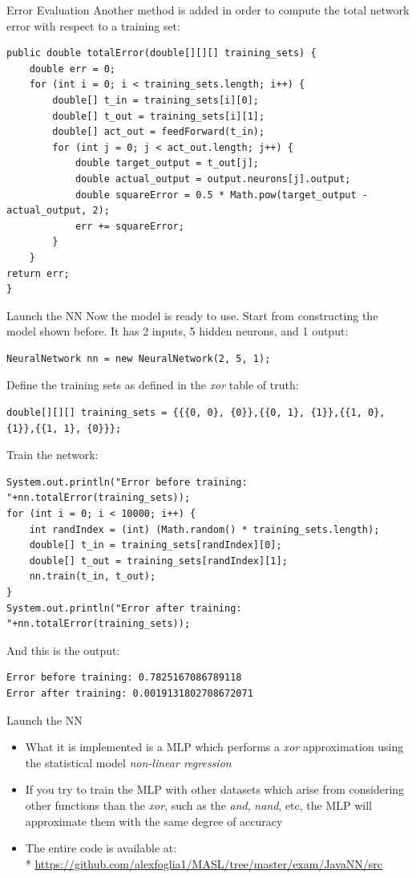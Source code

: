 \documentclass[xcolor ={table,usenames,dvipsnames}]{beamer}
\theoremstyle{definition}
\begin{document}
\begin{frame}[fragile]{Error Evaluation}
 Another method is added in order to compute the total network error with respect to a training set:
\begin{lstlisting}
public double totalError(double[][][] training_sets) {
	double err = 0;
	for (int i = 0; i < training_sets.length; i++) {
		double[] t_in = training_sets[i][0];
		double[] t_out = training_sets[i][1];
		double[] act_out = feedForward(t_in);
		for (int j = 0; j < act_out.length; j++) {
			double target_output = t_out[j];
			double actual_output = output.neurons[j].output;
			double squareError = 0.5 * Math.pow(target_output - actual_output, 2);
			err += squareError;
		}
	}
return err;
}
\end{lstlisting}
\end{frame}
\begin{frame}[fragile]{Launch the NN}
Now the model is ready to use. Start from constructing the model shown before. It has 2 inputs, 5 hidden neurons, and 1 output:
\begin{lstlisting}
NeuralNetwork nn = new NeuralNetwork(2, 5, 1);
\end{lstlisting}
Define the training sets as defined in the \emph{xor} table of truth:
\begin{lstlisting}
double[][][] training_sets = {{{0, 0}, {0}},{{0, 1}, {1}},{{1, 0}, {1}},{{1, 1}, {0}}};
\end{lstlisting}
Train the network:
\begin{lstlisting}
System.out.println("Error before training: "+nn.totalError(training_sets));
for (int i = 0; i < 10000; i++) {
	int randIndex = (int) (Math.random() * training_sets.length);
	double[] t_in = training_sets[randIndex][0];
	double[] t_out = training_sets[randIndex][1];
	nn.train(t_in, t_out);
}
System.out.println("Error after training: "+nn.totalError(training_sets));
\end{lstlisting}
And this is the output:
\begin{lstlisting}
Error before training: 0.7825167086789118
Error after training: 0.0019131802708672071
\end{lstlisting}
\end{frame}
\begin{frame}{Launch the NN}
\begin{itemize}
\item What it is implemented is a MLP which performs a \emph{xor} approximation using the statistical model \emph{non-linear regression}
\item  If you try to train the MLP with other datasets which arise from considering other functions than the \emph{xor}, such as the \emph{and}, \emph{nand}, etc, the MLP will approximate them with the same degree of accuracy
\item The entire code is available at:\\* \href{https://github.com/alexfoglia1/MASL/tree/master/exam/JavaNN/src}{https://github.com/alexfoglia1/MASL/tree/master/exam/JavaNN/src}
\end{itemize}
\end{frame}
\end{document}
